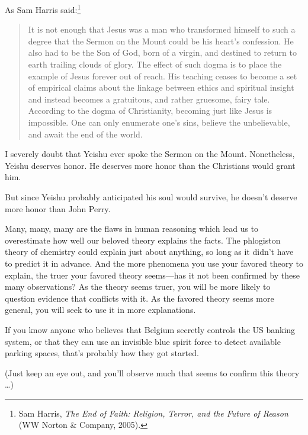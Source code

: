 {
 As Sam Harris said:\footnote{Sam Harris, \textit{The End of Faith: Religion, Terror, and the
Future of Reason} (WW Norton \& Company, 2005).}}

\begin{quote}
{
 It is not enough that Jesus was a man who transformed himself to
such a degree that the Sermon on the Mount could be his
heart's confession. He also had to be the Son of God,
born of a virgin, and destined to return to earth trailing clouds of
glory. The effect of such dogma is to place the example of Jesus
forever out of reach. His teaching ceases to become a set of empirical
claims about the linkage between ethics and spiritual insight and
instead becomes a gratuitous, and rather gruesome, fairy tale.
According to the dogma of Christianity, becoming just like Jesus is
impossible. One can only enumerate one's sins, believe
the unbelievable, and await the end of the world.}
\end{quote}

{
 I severely doubt that Yeishu ever spoke the Sermon on the Mount.
Nonetheless, Yeishu deserves honor. He deserves more honor than the
Christians would grant him.}

{
 But since Yeishu probably anticipated his soul would survive, he
doesn't deserve more honor than John Perry.}

\myendsectiontext


\bigskip


{
 Many, many, many are the flaws in human reasoning which lead us to
overestimate how well our beloved theory explains the facts. The
phlogiston theory of chemistry could explain just about anything, so
long as it didn't have to predict it in advance. And
the more phenomena you use your favored theory to explain, the truer
your favored theory seems---has it not been confirmed by these many
observations? As the theory seems truer, you will be more likely to
question evidence that conflicts with it. As the favored theory seems
more general, you will seek to use it in more explanations. }

{
 If you know anyone who believes that Belgium secretly controls the
US banking system, or that they can use an invisible blue spirit force
to detect available parking spaces, that's probably how
they got started.}

{
 (Just keep an eye out, and you'll observe much
that seems to confirm this theory \ldots)}

